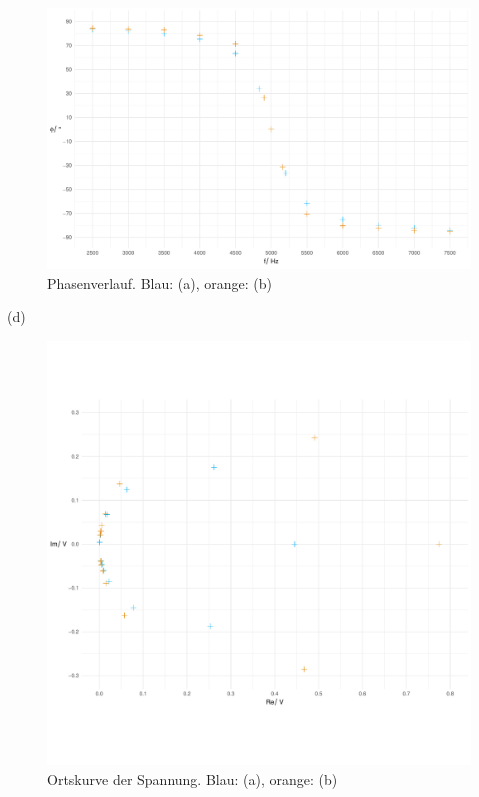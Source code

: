 \documentclass[a4paper, 12pt]{article}
\begin{document}
        \begin{figure}[H]
          \begin{center}
          \includegraphics[scale=0.3819660112501051]{./R/3_2/3_2_phase.pdf}
          \caption*{Phasenverlauf. Blau: (a), orange: (b)}
          \end{center}
        \end{figure}

      \noindent (d)\\

        \begin{figure}[H]
          \begin{center}
          \includegraphics[scale=0.3819660112501051]{./R/3_2/3_2_OK.pdf}
          \caption*{Ortskurve der Spannung. Blau: (a), orange: (b)}
          \end{center}
        \end{figure}
\end{document}

